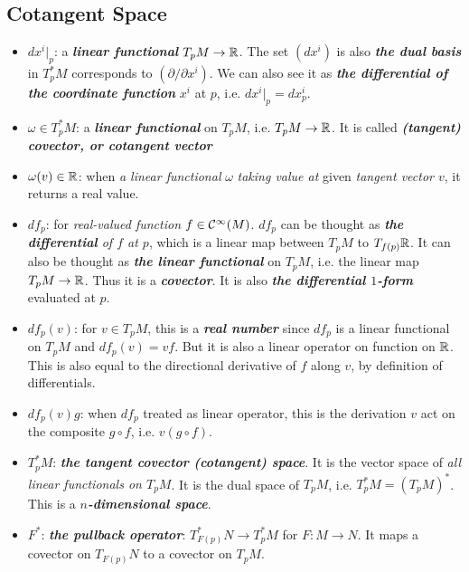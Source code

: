 \documentclass[11pt]{article}
\begin{document}
\subsection{Cotangent Space}
\begin{itemize}
\item $dx^i|_{p}$: \quad a \emph{\textbf{linear functional}} $T_pM \rightarrow {\mathbb R}$. The set $(dx^i)$ is also \emph{\textbf{the dual basis}} in $T_p^{*}M$ corresponds to $(\partial /\partial x^i)$. We can also see it as \emph{\textbf{the differential of the coordinate function}} $x^{i}$ at $p$, i.e. $dx^{i}|_{p} = dx_{p}^{i}$.

\item $\omega \in T_p^{*}M$: \quad a \emph{\textbf{linear functional}} on $T_pM$, i.e. $T_pM \rightarrow {\mathbb R}$. It is called \emph{\textbf{(tangent) covector, or cotangent vector}}

\item $\omega(v) \in {\mathbb R}$: \quad when \emph{a linear functional} $\omega$ \emph{taking value at} given \emph{tangent vector $v$}, it returns a real value. 


\item $df_p$: \quad for \emph{real-valued function} $f \in {\mathcal C}^{\infty}(M)$. $df_p$ can be thought as \emph{\textbf{the differential} of $f$ at $p$}, which is a linear map between $T_pM$ to $T_{f(p)}{\mathbb R}$. It can also be thought as \emph{\textbf{the linear functional}} on $T_pM$, i.e. the linear map $T_pM \rightarrow {\mathbb R}$. Thus it is a \emph{\textbf{covector}}. It is also \emph{\textbf{the differential $1$-form}} evaluated at $p$.

\item $df_p(v)$: \quad for $v \in T_pM$, this is a \emph{\textbf{real number}} since $df_p$ is a linear functional on $T_pM$ and $df_p(v) = vf$. But it is also a linear operator on function on ${\mathbb R}$. This is also equal to the directional derivative of $f$ along $v$, by definition of differentials.

\item $df_p(v)g$: \quad when $df_p$ treated as linear operator, this is the derivation $v$ act on the composite $g \circ f$, i.e. $v(g \circ f)$.

\item $T_p^{*}M$: \quad \emph{\textbf{the tangent covector (cotangent) space}}. It is the vector space of \emph{all linear functionals on $T_pM$}. It is the dual space of $T_pM$, i.e. $T_p^{*}M = (T_pM)^{*}$. This is a \emph{\textbf{$n$-dimensional space}}.

\item $F^{*}$: \quad \emph{\textbf{the pullback operator}}: $T_{F(p)}^{*}N \rightarrow T_{p}^{*}M$ for $F: M \rightarrow N$. It maps a covector on $T_{F(p)}N$ to a covector on $T_{p}M$. 
\end{itemize}
\end{document}
